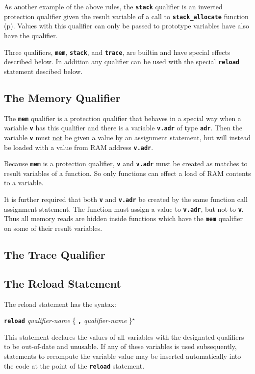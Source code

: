\documentclass[12pt]{article}
\makeatletter
\newcommand{\TT}[1]{{\tt \bfseries #1}}
\newcommand{\ttkey}[1]{\TT{#1}\index{#1@{\tt #1}}}
\newcommand{\pagref}[1]{p\pageref{#1}}
\newcommand{\STAR}{{\Large $^\star$}}
\makeatother
\begin{document}
As another example of the above rules, the \TT{stack} qualifier is
an inverted protection qualifier given the result variable of
a call to \TT{stack\_allocate} function (\pagref{STACK-ALLOCATE}).
Values with this qualifier can only be passed to prototype variables
have also have the qualifier.

Three qualifiers, \TT{mem}, \TT{stack},
and \TT{trace}, are builtin and have special
effects described below.
In addition any qualifier can be used with the special \TT{reload} statement
descibed below.

\subsection{The Memory Qualifier}
\label{THE-MEM-QUALIFIER}

The \ttkey{mem} qualifier is a protection qualifier that behaves
in a special way when a variable \TT{v} has this qualifier and
there is a variable \TT{v.adr} of type \TT{adr}.  Then the
variable \TT{v} must \underline{not} be given a value by an
assignment statement, but will instead be loaded with a value
from RAM address \TT{v.adr}.

Because \TT{mem} is a protection qualifier, \TT{v} and \TT{v.adr}
must be created as matches to result variables of a function.
So only functions can effect a load of RAM contents to a variable.

It is further required that both \TT{v} and \TT{v.adr} be created
by the same function call assignment statement.
The function must assign a value to
\TT{v.adr}, but not to \TT{v}.  Thus all memory reads are hidden
inside functions which have the \TT{mem} qualifier on some of
their result variables.


\subsection{The Trace Qualifier}
\label{THE-TRACE-QUALIFIER}

\subsection{The Reload Statement}
\label{THE-RELOAD-COMMAND}

The reload statement has the syntax:
\begin{center}
\ttkey{reload} {\em qualifier-name} \{ \TT{,} {\em qualifier-name} \}\STAR{}
\end{center}

This statement declares the values of all variables with the designated
qualifiers to be out-of-date and unusable.  If any of these variables
is used subsequently, statements to recompute the variable value
may be inserted automatically into the code at the point of the
\TT{reload} statement.
\end{document}
